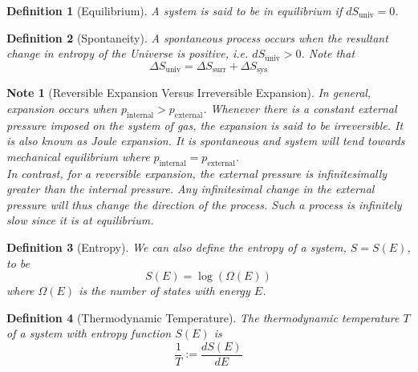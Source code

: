 \documentclass[a4paper]{article}
\newtheorem{Note}{Note}[section]
\theoremstyle{new}
\newtheorem{defi}{Definition}[section]
\begin{document}
\begin{defi}[Equilibrium]
A system is said to be in equilibrium if $dS_{\text{univ}}=0$.
\end{defi}
\begin{defi}[Spontaneity]
A spontaneous process occurs when the resultant change in entropy of the Universe is positive, i.e. $dS_{\text{univ}}>0$. Note that
$$\Delta S_{\text{univ}}=\Delta S_{\text{surr}}+\Delta S_{\text{sys}}$$
\end{defi}
\begin{Note}[Reversible Expansion Versus Irreversible Expansion]
In general, expansion occurs when $p_{\text{internal}}>p_{\text{external}}$. Whenever there is a constant external pressure imposed on the system of gas, the expansion is said to be irreversible. It is also known as Joule expansion. It is spontaneous and system will tend towards mechanical equilibrium where $p_{\text{internal}}=p_{\text{external}}$.\\[5pt]
In contrast, for a reversible expansion, the external pressure is infinitesimally greater than the internal pressure. Any infinitesimal change in the external pressure will thus change the direction of the process. Such a process is infinitely slow since it is at equilibrium.
\end{Note}
\begin{defi}[Entropy]
We can also define the entropy of a system, $S=S(E)$, to be 
$$S(E)=\log(\Omega(E))$$
where $\Omega(E)$ is the number of states with energy $E$.
\end{defi}
\begin{defi}[Thermodynamic Temperature]
The thermodynamic temperature $T$ of a system with entropy function $S(E)$ is
$$\frac{1}{T}:=\frac{dS(E)}{dE}$$
\end{defi}
\end{document}
